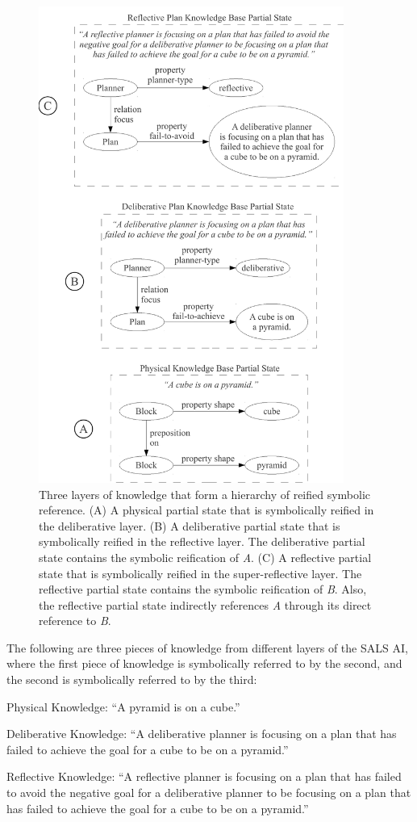 \begin{figure}
\centering
\includegraphics[width=10cm]{gfx/multiple_layers_of_symbolic_reification}
\caption[Three layers of knowledge that form a hierarchy of reified
  symbolic reference.]{Three layers of knowledge that form a hierarchy
  of reified symbolic reference.  (A) A physical partial state that is
  symbolically reified in the deliberative layer.  (B) A deliberative
  partial state that is symbolically reified in the reflective layer.
  The deliberative partial state contains the symbolic reification of
  \emph{A}.  (C) A reflective partial state that is symbolically
  reified in the super-reflective layer.  The reflective partial state
  contains the symbolic reification of \emph{B}.  Also, the reflective
  partial state indirectly references \emph{A} through its direct
  reference to \emph{B}.}
\label{figure:multiple_layers_of_symbolic_reification}
\end{figure}
The following are three pieces of knowledge from different layers of
the SALS AI, where the first piece of knowledge is symbolically
referred to by the second, and the second is symbolically referred to
by the third:
\begin{packed_enumerate}
\item{Physical Knowledge: ``A pyramid is on a cube.''}
\item{Deliberative Knowledge: ``A deliberative planner is focusing on
  a plan that has failed to achieve the goal for a cube to be on a
  pyramid.''}
\item{Reflective Knowledge: ``A reflective planner is focusing on a
  plan that has failed to avoid the negative goal for a deliberative
  planner to be focusing on a plan that has failed to achieve the goal
  for a cube to be on a pyramid.''}
\end{packed_enumerate}
